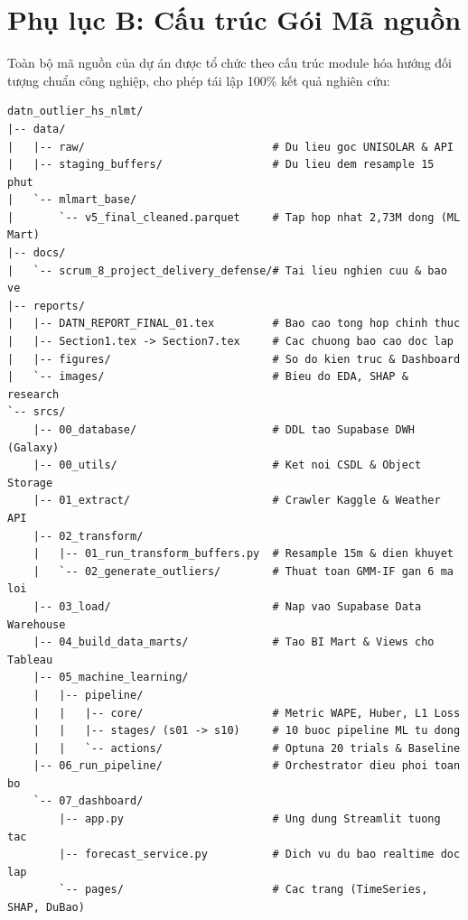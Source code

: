 \documentclass[12pt, a4paper]{report}
\begin{document}
\chapter*{Phụ lục B: Cấu trúc Gói Mã nguồn}
\label{app:code}

Toàn bộ mã nguồn của dự án được tổ chức theo cấu trúc module hóa hướng đối tượng chuẩn công nghiệp, cho phép tái lập 100\% kết quả nghiên cứu:

\begin{lstlisting}[basicstyle=\ttfamily\scriptsize, breaklines=false, numbers=none, caption={Sơ đồ cấu trúc cây thư mục mã nguồn của dự án The Outliers}]
datn_outlier_hs_nlmt/
|-- data/
|   |-- raw/                             # Du lieu goc UNISOLAR & API
|   |-- staging_buffers/                 # Du lieu dem resample 15 phut
|   `-- mlmart_base/
|       `-- v5_final_cleaned.parquet     # Tap hop nhat 2,73M dong (ML Mart)
|-- docs/
|   `-- scrum_8_project_delivery_defense/# Tai lieu nghien cuu & bao ve
|-- reports/
|   |-- DATN_REPORT_FINAL_01.tex         # Bao cao tong hop chinh thuc
|   |-- Section1.tex -> Section7.tex     # Cac chuong bao cao doc lap
|   |-- figures/                         # So do kien truc & Dashboard
|   `-- images/                          # Bieu do EDA, SHAP & research
`-- srcs/
    |-- 00_database/                     # DDL tao Supabase DWH (Galaxy)
    |-- 00_utils/                        # Ket noi CSDL & Object Storage
    |-- 01_extract/                      # Crawler Kaggle & Weather API
    |-- 02_transform/
    |   |-- 01_run_transform_buffers.py  # Resample 15m & dien khuyet
    |   `-- 02_generate_outliers/        # Thuat toan GMM-IF gan 6 ma loi
    |-- 03_load/                         # Nap vao Supabase Data Warehouse
    |-- 04_build_data_marts/             # Tao BI Mart & Views cho Tableau
    |-- 05_machine_learning/
    |   |-- pipeline/
    |   |   |-- core/                    # Metric WAPE, Huber, L1 Loss
    |   |   |-- stages/ (s01 -> s10)     # 10 buoc pipeline ML tu dong
    |   |   `-- actions/                 # Optuna 20 trials & Baseline
    |-- 06_run_pipeline/                 # Orchestrator dieu phoi toan bo
    `-- 07_dashboard/
        |-- app.py                       # Ung dung Streamlit tuong tac
        |-- forecast_service.py          # Dich vu du bao realtime doc lap
        `-- pages/                       # Cac trang (TimeSeries, SHAP, DuBao)
\end{lstlisting}


\end{document}
